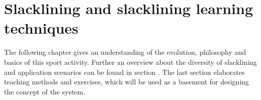 \chapter{Slacklining  and slacklining learning techniques}\label{3_slacklining}
The following chapter \textit{} gives an understanding of the evolution, philosophy and basics of this sport activity. Further an overview about the diversity of slacklining and application scenarios can be found in section \textit{}. The last section \textit{} elaborates teaching methods and exercises, which will be used as a basement for designing the concept of the system.
 

 
 
 
 
 
  